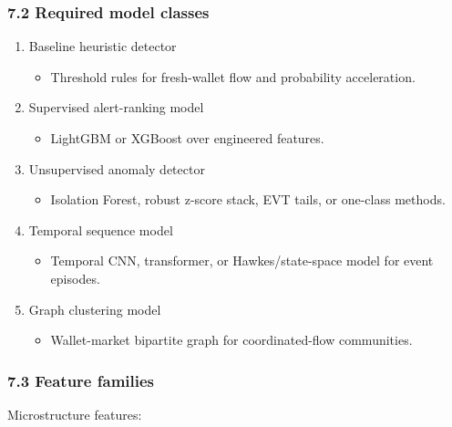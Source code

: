 \documentclass[
]{article}
\providecommand{\tightlist}{%
  \setlength{\itemsep}{0pt}\setlength{\parskip}{0pt}}
\begin{document}
\subsubsection{7.2 Required model
classes}\label{72-required-model-classes}

\begin{enumerate}
\def\labelenumi{\arabic{enumi}.}
\item
  Baseline heuristic detector

  \begin{itemize}
  \tightlist
  \item
    Threshold rules for fresh-wallet flow and probability acceleration.
  \end{itemize}
\item
  Supervised alert-ranking model

  \begin{itemize}
  \tightlist
  \item
    LightGBM or XGBoost over engineered features.
  \end{itemize}
\item
  Unsupervised anomaly detector

  \begin{itemize}
  \tightlist
  \item
    Isolation Forest, robust z-score stack, EVT tails, or one-class
    methods.
  \end{itemize}
\item
  Temporal sequence model

  \begin{itemize}
  \tightlist
  \item
    Temporal CNN, transformer, or Hawkes/state-space model for event
    episodes.
  \end{itemize}
\item
  Graph clustering model

  \begin{itemize}
  \tightlist
  \item
    Wallet-market bipartite graph for coordinated-flow communities.
  \end{itemize}
\end{enumerate}

\subsubsection{7.3 Feature families}\label{73-feature-families}

Microstructure features:
\end{document}
